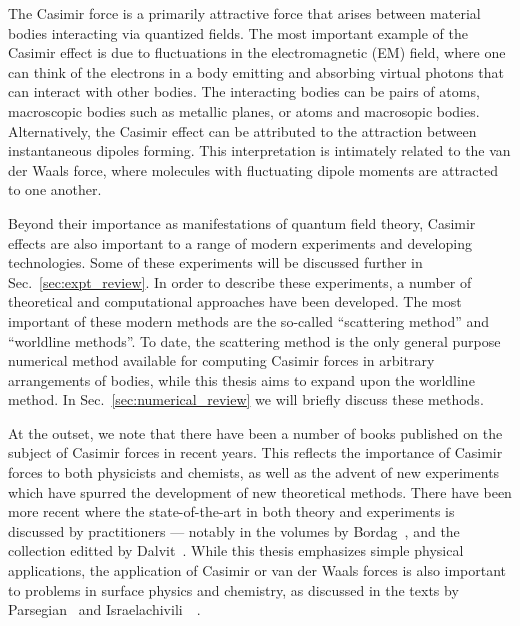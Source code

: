 The Casimir force is a primarily attractive force that arises between material bodies interacting via 
quantized fields.
The most important example of the Casimir effect is due to fluctuations in the electromagnetic (EM) field, 
where one can think of the electrons in a body emitting and absorbing virtual photons that can interact
with other bodies.  The interacting bodies can be pairs of atoms, 
macroscopic bodies such as metallic planes, or atoms and macrosopic bodies.
Alternatively, the Casimir effect can be attributed to the attraction between instantaneous dipoles forming.  
This interpretation is intimately related to the van der Waals force, where 
molecules with fluctuating dipole moments are attracted to one another.


Beyond their importance as manifestations of quantum field theory, Casimir effects are also 
important to a range of modern experiments and developing technologies.  Some of these experiments 
will be discussed further in Sec.~\ref{sec:expt_review}.  In order to describe these experiments,
a number of theoretical and computational approaches have been developed.  The most important of
these modern methods are the so-called ``scattering method'' and ``worldline methods''.
To date, the scattering method is the only general purpose numerical method available for computing
Casimir forces in arbitrary arrangements of bodies, while this thesis aims to expand upon the worldline method.  
In Sec.~\ref{sec:numerical_review} we will briefly discuss these methods.  

At the outset, we note that there have been a number of books published on the subject of Casimir forces 
in recent years.  This reflects the importance of Casimir forces to both physicists and chemists, as 
well as the advent of new experiments which have spurred the development of new theoretical methods.  
There have been more recent where the state-of-the-art in both theory and experiments is discussed by practitioners --- 
notably in the volumes by Bordag~\etal\cite{Bordag2009}, 
and the collection editted by Dalvit~\etal\cite{Dalvit2011}.  
While this thesis emphasizes simple physical applications, the application of Casimir or 
van der Waals forces is also important to problems in surface physics and chemistry, as discussed in the texts by 
 Parsegian~\cite{Parsegian2006} and Israelachivili~\etal~\cite{Israelachvili2011}.

